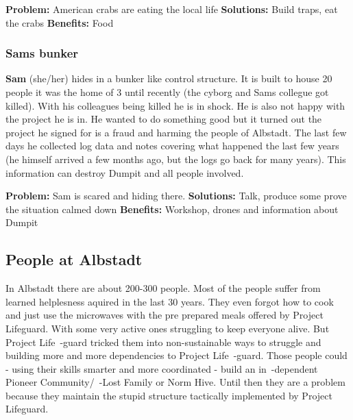 \textbf{Problem:} American crabs are eating the local life
\textbf{Solutions:} Build traps, eat the crabs
\textbf{Benefits:} Food

\subsubsection{Sams bunker}

\textbf{Sam} (she/her) hides in a bunker like control structure. It is built to house 20 people it was the home of 3 until recently (the cyborg and Sams collegue got killed). With his colleagues being killed he is in shock. He is also not happy with the project he is in. He wanted to do something good but it turned out the project he signed for is a fraud and harming the people of Albstadt. The last few days he collected log data and notes covering what happened the last few years (he himself arrived a few months ago, but the logs go back for many years). This information can destroy Dumpit and all people involved.

\textbf{Problem:} Sam is scared and hiding there.
\textbf{Solutions:} Talk, produce some prove the situation calmed down
\textbf{Benefits:} Workshop, drones and information about Dumpit


\subsection{People at Albstadt}

In Albstadt there are about 200-300 people. Most of the people suffer from learned helplesness aquired in the last 30 years. They even forgot how to cook and just use the microwaves with the pre prepared meals offered by Project Lifeguard. With some very active ones struggling to keep everyone alive. But Project Life~-guard tricked them into non-sustainable ways to struggle and building more and more dependencies to Project Life~-guard. Those people could - using their skills smarter and more coordinated - build an in~-dependent Pioneer Community/~-Lost Family or Norm Hive. Until then they are a problem because they maintain the stupid structure tactically implemented by Project Lifeguard.

